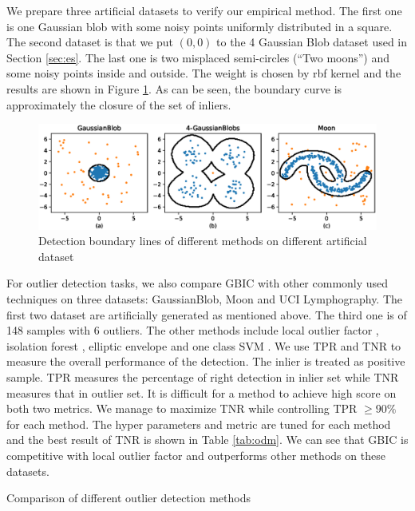 We prepare three artificial datasets to verify our empirical method. The first one is one Gaussian blob with some noisy points uniformly distributed in a square. The second dataset is that we put $(0,0)$ to the 4 Gaussian Blob dataset used in Section \ref{sec:es}. The last one is two misplaced semi-circles (``Two moons'') and some noisy points inside and outside. The weight is chosen by rbf kernel and the results are shown in Figure \ref{fig:boundary}. As can be seen, the boundary curve is approximately the closure of the set of inliers.
\begin{figure}[!ht]
	\centering
	\includegraphics[width=\textwidth]{pic/outlier_boundary_illustration.eps}
	\caption{Detection boundary lines of different methods on different artificial dataset}	\label{fig:boundary}
\end{figure}

For outlier detection tasks, we also compare GBIC with other commonly used techniques on three datasets: GaussianBlob, Moon and UCI Lymphography. The first two dataset are artificially generated as mentioned above. The third one is of 148 samples with 6 outliers. The other methods include local outlier factor \citep{Breunig}, isolation forest \citep{if}, elliptic envelope \citep{rousseeuw1999fast} and one class SVM \citep{svm}. We use TPR and TNR to measure the overall performance of the detection. The inlier is treated as positive sample. TPR measures the percentage of right detection in inlier set while TNR measures that in outlier set. It is difficult for a method to achieve high score on both two metrics. We manage to maximize TNR while controlling TPR $\geq 90\%$ for each method. The hyper parameters and metric are tuned for each method and the best result of TNR is shown in Table \ref{tab:odm}. We can see that GBIC is competitive with local outlier factor and outperforms other methods on these datasets.

\begin{table}
\centering

\caption{Comparison of different outlier detection methods}\label{tab:odm}
\end{table}

